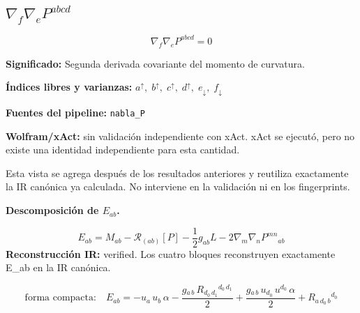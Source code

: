 \documentclass[11pt]{article}
\begin{document}
\subsection*{$ \nabla_f\nabla_e P^{abcd} $}
\begin{dmath*}[breakdepth={5}]
\nabla_f\nabla_e P^{abcd} = 0
\end{dmath*}
\par\vspace{1.2\baselineskip}\noindent
\begin{minipage}{\linewidth}
\textbf{Significado:} Segunda derivada covariante del momento de curvatura.\par
\textbf{Índices libres y varianzas:} $ a^{\uparrow},\;b^{\uparrow},\;c^{\uparrow},\;d^{\uparrow},\;e_{\downarrow},\;f_{\downarrow} $\par
\textbf{Fuentes del pipeline:} \texttt{nabla\_P}\par
\textbf{Wolfram/xAct:} sin validación independiente con xAct. xAct se ejecutó, pero no existe una identidad independiente para esta cantidad.\par
\end{minipage}
\par\bigskip{}\par
Esta vista se agrega después de los resultados anteriores y reutiliza exactamente la IR canónica ya calculada. No interviene en la validación ni en los fingerprints.\par
{}
\par\medskip\noindent\textbf{Descomposición de $ E_{ab} $.}\par
\begin{dmath*}[breakdepth={5}]
E_{ab}=M_{ab}-\mathcal{R}_{(ab)}[P]-\frac{1}{2}g_{ab}L-2\nabla_m\nabla_nP^{mn}{}_{ab}
\end{dmath*}
\textbf{Reconstrucción IR:} verified. Los cuatro bloques reconstruyen exactamente E\_ab en la IR canónica.\par
\begin{dmath*}[breakdepth={5}]
\text{forma compacta:}\quad E_{ab} = -u{}_{a}\,u{}_{b}\,\alpha - \frac{g{}_{a\,b}\,R{}_{d_{0}\,d_{1}}{}^{d_{0}\,d_{1}}}{2} + \frac{g{}_{a\,b}\,u{}_{d_{0}}\,u{}^{d_{0}}\,\alpha}{2} + R{}_{a\,d_{0}\,b}{}^{d_{0}}
\end{dmath*}
\end{document}

